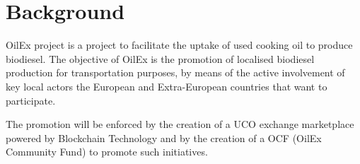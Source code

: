 \documentclass[11pt,fleqn]{book} %
\begin{document}

\section{Background}
OilEx project is a project to facilitate the uptake of used cooking oil to produce biodiesel. The objective of OilEx is the promotion of localised biodiesel production for transportation purposes, by means of the active involvement of key local actors the European and Extra-European countries that want to participate.

The promotion will be enforced by the creation of a UCO exchange marketplace powered by Blockchain Technology and by the creation of a OCF (OilEx Community Fund) to promote such initiatives.
\end{document}

